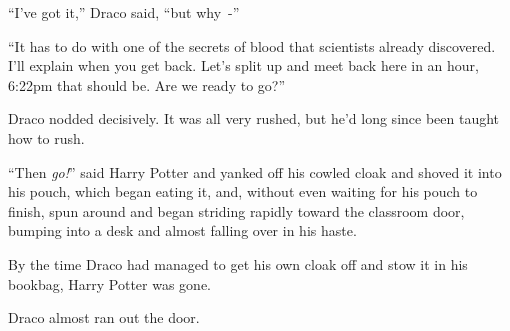 ``I've got it,'' Draco said, ``but why~-''

``It has to do with one of the secrets of blood that scientists already discovered. I'll explain when you get back. Let's split up and meet back here in an hour, 6:22pm that should be. Are we ready to go?''

Draco nodded decisively. It was all very rushed, but he'd long since been taught how to rush.

``Then \emph{go!}'' said Harry Potter and yanked off his cowled cloak and shoved it into his pouch, which began eating it, and, without even waiting for his pouch to finish, spun around and began striding rapidly toward the classroom door, bumping into a desk and almost falling over in his haste.

By the time Draco had managed to get his own cloak off and stow it in his bookbag, Harry Potter was gone.

Draco almost ran out the door.
